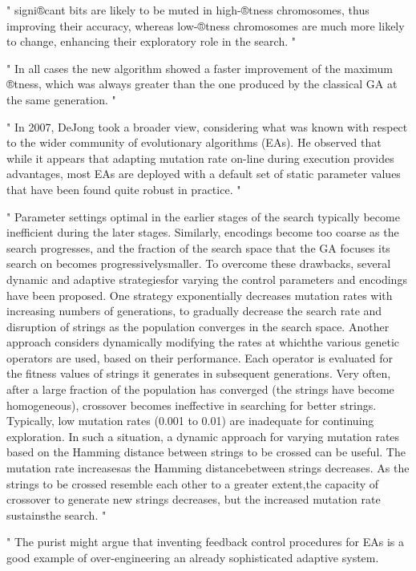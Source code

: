 "
signi®cant bits are likely to be muted in high-®tness chromosomes, thus improving their accuracy, whereas low-®tness chromosomes are much more likely to change, enhancing their exploratory role in the search.
"\cite{marsili_libelli_adaptive_2000}

"
In all cases the new algorithm showed a faster improvement of the maximum ®tness, which was always greater than the one produced by the classical GA at the same generation.
"\cite{marsili_libelli_adaptive_2000}


"
In 2007, DeJong took a broader view, considering what was known with respect to the wider community of evolutionary algorithms (EAs). He observed that while it appears that adapting mutation rate on-line during execution provides advantages, most EAs are deployed with a default set of static parameter values that have been found quite robust in practice.
"\cite{mills_determining_2015}

"
Parameter settings optimal in the earlier stages of the search typically become inefficient during the later stages. Similarly, encodings become too coarse as the search progresses, and the fraction of the search space that the GA focuses its search on becomes progressivelysmaller. To overcome these drawbacks, several dynamic and adaptive strategiesfor varying the control parameters and encodings have been proposed. One strategy exponentially decreases mutation rates with increasing numbers of generations, to gradually decrease the search rate and disruption of strings as the population converges in the search space. Another approach considers dynamically modifying the rates at whichthe various genetic operators are used, based on their performance. Each operator is evaluated for the fitness values of strings it generates in subsequent generations. Very often, after a large fraction of the population has converged (the strings have become homogeneous), crossover becomes ineffective in searching for better strings. Typically, low mutation rates (0.001 to 0.01) are inadequate for continuing exploration. In such a situation, a dynamic approach for varying mutation rates based on the Hamming distance between strings to be crossed can be useful. The mutation rate increasesas the Hamming distancebetween strings decreases. As the strings to be crossed resemble each other to a greater extent,the capacity of crossover to generate new strings decreases, but the increased mutation rate sustainsthe search.
"\cite{srinivas_genetic_1994}


"
The purist might argue that inventing feedback control procedures for EAs is a good example of over-engineering an already sophisticated adaptive system.

